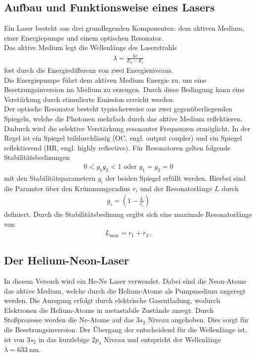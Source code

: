\subsection{Aufbau und Funktionsweise eines Lasers}
Ein Laser besteht aus drei grundlegenden Komponenten: dem aktiven Medium, einer Energiepumpe und einem optischen Resonator.\\
Das aktive Medium legt die Wellenlänge des Laserstrahls
\begin{align}
    \lambda = \frac{h c}{E_k - E_i} \label{eqn:Wellenlange}
\end{align} 
fest durch die Energiedifferenz von zwei Energieniveaus.\\
Die Energiepumpe führt dem aktiven Medium Energie zu, um eine Besetzungsinversion im Medium zu erzeugen. Durch diese Bedingung kann eine Verstärkung durch stimulierte Emission erreicht werden.\\
Der optische Resonator besteht typischerweise aus zwei gegenüberliegenden Spiegeln, welche die Photonen mehrfach durch das aktive Medium reflektieren.
Dadurch wird die selektive Verstärkung resonanter Frequenzen ermöglicht. In der Regel ist ein Spiegel teildurchlässig (OC, engl. output coupler) und ein Spiegel reflektierend (HR, engl. highly reflective).
Für Resonatoren gelten folgende Stabilitätsbedinungen 
\begin{align}
    0 < g_1 g_2 < 1\text{ oder } g_1 = g_2 = 0 \label{eqn:Stabilitaetsbedingung}
\end{align}
mit den Stabilitätsparametern $g_i$ der beiden Spiegel erfüllt werden. Hierbei sind die Paramter über den Krümmungsradius $r_i$ und der Resonatorlänge $L$ durch
\begin{align}
    g_i = \left(1- \frac{L}{r_i}\right)\label{eqn:stabilitaetsparameter}
\end{align}
definiert. 
Durch die Stabilitätsbedinung ergibt sich eine maximale Resonatorlänge von
\begin{align}
    L_{\text{max}} = r_1 + r_2\,.\label{eqn:maximaleResonatorlaenge}
\end{align}
\cite{laserspektroskopie}

\subsection{Der Helium-Neon-Laser}
In diesem Versuch wird ein He-Ne Laser verwendet. Dabei sind die Neon-Atome das aktive Medium, welche durch die Helium-Atome als Pumpmedium angeregt werden. 
Die Anregung erfolgt durch elektrische Gasentladung, wodurch Elektronen die Helium-Atome in metastabile Zustände anregt. Durch Stoßprozesse werden die Ne-Atome auf das $3s_2$ Niveau angehoben. 
Dies sorgt für die Besetzungsinversion. 
Der Übergang der entscheidend für die Wellenlänge ist, ist von $3s_2$ in das kurzlebige $2p_4$ Niveau und entspricht der Wellenlänge $\lambda = \SI{633}{\nano\meter}$. \cite{laser} \cite{leifiLaser}



